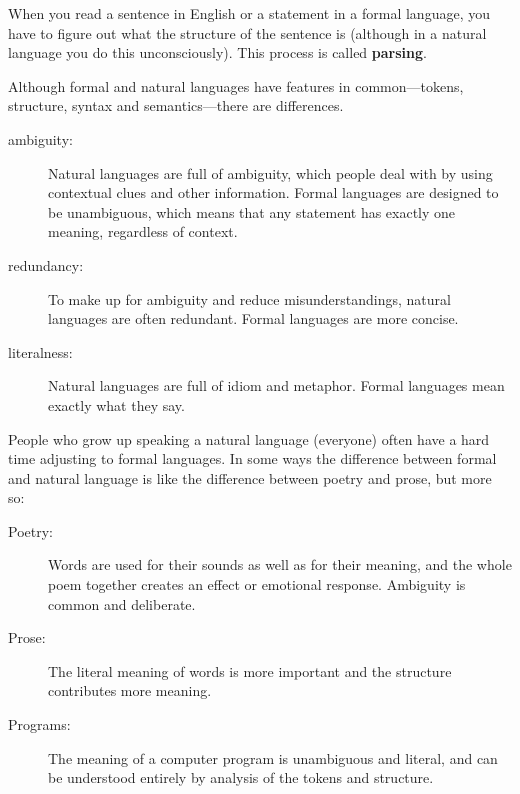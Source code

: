 \documentclass[12pt]{book}
\theoremstyle{definition}
\begin{document}
When you read a sentence in English or a statement in a formal
language, you have to figure out what the structure of the sentence is
(although in a natural language you do this unconsciously).  This
process is called {\bf parsing}.


Although formal and natural languages have features in
common---tokens, structure, syntax and semantics---there are
differences.


\begin{description}

\item[ambiguity:] Natural languages are full of ambiguity, which
  people deal with by using contextual clues and other information.
  Formal languages are designed to be unambiguous, which means that
  any statement has exactly one meaning, regardless of context.

\item[redundancy:] To make up for ambiguity and reduce
  misunderstandings, natural languages are often redundant.  Formal
  languages are more concise.

\item[literalness:] Natural languages are full of idiom and
metaphor.  Formal languages mean exactly what they say.

\end{description}

People who grow up speaking a natural language (everyone) often have a
hard time adjusting to formal languages.  In some ways the difference
between formal and natural language is like the difference between
poetry and prose, but more so:


\begin{description}

\item[Poetry:] Words are used for their sounds as well as for
their meaning, and the whole poem together creates an effect or
emotional response.  Ambiguity is common and deliberate.

\item[Prose:] The literal meaning of words is more important
and the structure contributes more meaning.

\item[Programs:] The meaning of a computer program is unambiguous
and literal, and can be understood entirely by analysis of the
tokens and structure.

\end{description}
\end{document}
